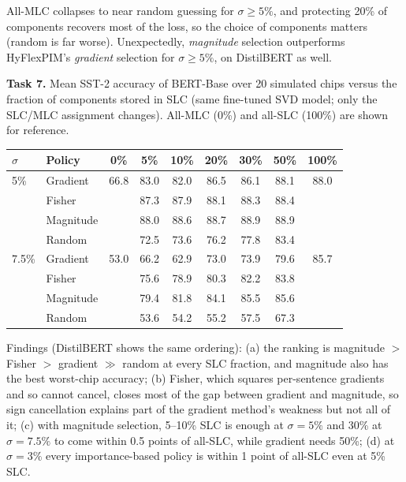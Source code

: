 \documentclass[10pt,a4paper]{article}
\begin{document}
\noindent All-MLC collapses to near random guessing for $\sigma\geq5\%$, and protecting 20\% of
components recovers most of the loss, so the choice of components matters (random is far worse).
Unexpectedly, \emph{magnitude} selection outperforms HyFlexPIM's \emph{gradient} selection for
$\sigma\geq5\%$, on DistilBERT as well.

\noindent\textbf{Task 7.} Mean SST-2 accuracy of BERT-Base over 20 simulated chips versus the fraction of
components stored in SLC (same fine-tuned SVD model; only the SLC/MLC assignment changes).
All-MLC (0\%) and all-SLC (100\%) are shown for reference.

\begin{table}[h]
\centering\small
\begin{tabular}{@{}llccccccc@{}}
\toprule
$\sigma$ & Policy & 0\% & 5\% & 10\% & 20\% & 30\% & 50\% & 100\% \\
\midrule
5\%   & Gradient  & 66.8 & 83.0 & 82.0 & 86.5 & 86.1 & 88.1 & 88.0 \\
      & Fisher    &      & 87.3 & 87.9 & 88.1 & 88.3 & 88.4 & \\
      & Magnitude &      & 88.0 & 88.6 & 88.7 & 88.9 & 88.9 & \\
      & Random    &      & 72.5 & 73.6 & 76.2 & 77.8 & 83.4 & \\
\midrule
7.5\% & Gradient  & 53.0 & 66.2 & 62.9 & 73.0 & 73.9 & 79.6 & 85.7 \\
      & Fisher    &      & 75.6 & 78.9 & 80.3 & 82.2 & 83.8 & \\
      & Magnitude &      & 79.4 & 81.8 & 84.1 & 85.5 & 85.6 & \\
      & Random    &      & 53.6 & 54.2 & 55.2 & 57.5 & 67.3 & \\
\bottomrule
\end{tabular}
\end{table}

\noindent Findings (DistilBERT shows the same ordering): (a) the ranking is
magnitude $>$ Fisher $>$ gradient $\gg$ random at every SLC fraction, and magnitude also has the best
worst-chip accuracy; (b) Fisher, which squares per-sentence gradients and so cannot cancel, closes most
of the gap between gradient and magnitude, so sign cancellation explains part of the gradient method's
weakness but not all of it; (c) with magnitude selection, 5--10\% SLC is enough at $\sigma=5\%$ and
30\% at $\sigma=7.5\%$ to come within 0.5 points of all-SLC, while gradient needs 50\%; (d) at
$\sigma=3\%$ every importance-based policy is within 1 point of all-SLC even at 5\% SLC.
\end{document}
